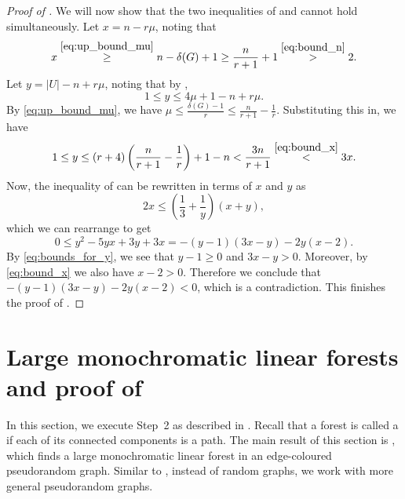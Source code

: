 \documentclass[10pt,a4paper,reqno]{amsart}
\begin{document}
\begin{proof}[Proof of ]
We will now show that the two inequalities of  and  cannot hold simultaneously. Let $x = n - r\mu$, noting that 
\begin{equation}\label{eq:bound_x}
      x \stackrel{\Cref{eq:up_bound_mu}}{\ge} n - \delta(G) + 1\ge \frac{n}{r+1} + 1 \stackrel{\Cref{eq:bound_n}}{>} 2.
\end{equation}
Let $y = |U| - n + r \mu$, noting that by  , 
\[
     1 \le y \le 4\mu + 1 - n + r\mu.
\]
By \eqref{eq:up_bound_mu}, we have $\mu \le \frac{\delta(G) - 1}{r} \le \frac{n}{r+1}- \frac{1}{r}$. Substituting this in, we have
\begin{equation}\label{eq:bounds_for_y}
    1 \le y \le (r+4)\left(\frac{n}{r+1} - \frac{1}{r}\right) + 1 - n < \frac{3n}{r+1}  \stackrel{\Cref{eq:bound_x}}{<} 3x.
\end{equation}
Now, the inequality of  can be rewritten in terms of $x$ and $y$ as
  \[
  2x \le \left(\frac{1}{3} + \frac{1}{y}\right)(x+y),
  \]
  which we can rearrange to get
  \[
  0 \le y^2  - 5yx  + 3y + 3x = - (y-1)(3x-y) - 2y(x-2).
  \]
By \eqref{eq:bounds_for_y}, we see that $y - 1 \ge 0$ and $3x - y >0$. Moreover,  by \eqref{eq:bound_x} we also have $x - 2 > 0$. Therefore we conclude that $- (y-1)(3x-y) - 2y(x-2) < 0$, which is a contradiction. 
This finishes the proof of .
\end{proof}


\bigskip \section{Large monochromatic linear forests and proof of \texorpdfstring{}{Theorem 1.2}}
\label{sec:lonG_{n,M}ono_paths}
In this section, we execute Step~2 as described in . Recall that a forest is called a  if each of its connected components is a path. The main result of this section is , which finds a large monochromatic linear forest in an edge-coloured pseudorandom graph. Similar to \cite{Gishboliner2021colourbiased}, instead of random graphs, we work with more general pseudorandom graphs. 
\end{document}
